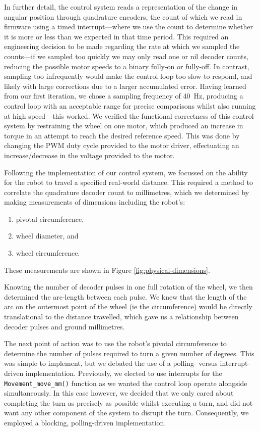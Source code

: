 \documentclass[conference]{IEEEtran}
\begin{document}
In further detail, the control system reads a representation of the change in angular position through quadrature encoders, the count of which we read in firmware using a timed interrupt—where we use the count to determine whether it is more or less than we expected in that time period.
This required an engineering decision to be made regarding the rate at which we sampled the counts—if we sampled too quickly we may only read one or nil decoder counts, reducing the possible motor speeds to a binary fully-on or fully-off.
In contrast, sampling too infrequently would make the control loop too slow to respond, and likely with large corrections due to a larger accumulated error.
Having learned from our first iteration, we chose a sampling frequency of \qty{40}{\hertz}, producing a control loop with an acceptable range for precise comparisons whilst also running at high speed—this worked.
We verified the functional correctness of this control system by restraining the wheel on one motor, which produced an increase in torque in an attempt to reach the desired reference speed.
This was done by changing the PWM duty cycle provided to the motor driver, effectuating an increase/decrease in the voltage provided to the motor.

Following the implementation of our control system, we focussed on the ability for the robot to travel a specified real-world distance.
This required a method to correlate the quadrature decoder count to millimetres, which we determined by making measurements of dimensions including the robot's:
\begin{enumerate}
	\item pivotal circumference,
	\item wheel diameter, and
	\item wheel circumference.
\end{enumerate}
These measurements are shown in Figure \ref{fig:physical-dimensions}.

Knowing the number of decoder pulses in one full rotation of the wheel, we then determined the arc-length between each pulse. We knew that the length of the arc on the outermost point of the wheel (ie the circumference) would be directly translational to the distance travelled, which gave us a relationship between decoder pulses and ground millimetres.

The next point of action was to use the robot's pivotal circumference to determine the number of pulses required to turn a given number of degrees.
This was simple to implement, but we debated the use of a polling- versus interrupt-driven implementation.
Previously, we elected to use interrupts for the \texttt{Movement\_move\_mm()} function as we wanted the control loop operate alongside simultaneously.
In this case however, we decided that we only cared about completing the turn as precisely as possible whilst executing a turn, and did not want any other component of the system to disrupt the turn.
Consequently, we employed a blocking, polling-driven implementation.
\end{document}
